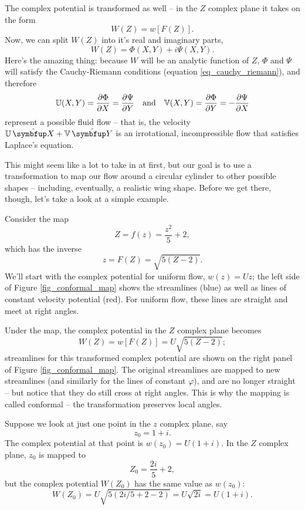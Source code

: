 The complex potential is transformed as well -- in the $Z$ complex plane it takes on the form
\begin{equation}
W(Z) = w[F(Z)].
\end{equation}
Now, we can split $W(Z)$ into it's real and imaginary parts,
\begin{equation}
W(Z) = \Phi(X, Y) + i\Psi(X, Y).
\end{equation}
Here's the amazing thing:  because $W$ will be an analytic function of $Z$, $\Phi$ and $\Psi$ will satisfy the Cauchy-Riemann conditions (equation \ref{eq_cauchy_riemann}), and therefore
\begin{equation}
\mathbb{U}(X, Y) = \frac{\partial {\Phi}}{\partial {X}} = \frac{\partial {\Psi}}{\partial {Y}} \quad \text{and} \quad \mathbb{V}(X, Y) = \frac{\partial {\Phi}}{\partial {Y}} = -\frac{\partial {\Psi}}{\partial {X}}
\end{equation}
represent a possible fluid flow -- that is, the velocity  $\U \, \unit{X} +  \V \, \unit{Y}$ is an irrotational, incompressible flow that satisfies Laplace's equation.

This might seem like a lot to take in at first, but our goal is to use a transformation to map our flow around a circular cylinder to other possible shapes -- including, eventually, a realistic wing shape.  Before we get there, though, let's take a look at a simple example.



\begin{example}
\label{ex_conformal_map}
Consider the map
\[
Z = f(z) = \frac{z^2}{5} + 2,
\]
which has the inverse 
\[
z = F(Z) = \sqrt{5(Z-2)}.
\]
We'll start with the complex potential for uniform flow, $w(z) = Uz$; the left side of Figure \ref{fig_conformal_map} shows the streamlines (blue) as well as lines of constant velocity potential (red).  For uniform flow, these lines are straight and meet at right angles.

Under the map, the complex potential in the $Z$ complex plane becomes
\[
W(Z) = w[F(Z)] = U\sqrt{5(Z-2)};
\]
streamlines for this transformed complex potential are shown on the right panel of Figure \ref{fig_conformal_map}.  The original streamlines are mapped to new streamlines (and similarly for the lines of constant $\varphi$), and are no longer straight -- but notice that they do still cross at right angles.  This is why the mapping is called conformal -- the transformation preserves local angles.

Suppose we look at just one point in the $z$ complex plane, say
\[
z_0 = 1 + i.
\]
The complex potential at that point is $w(z_0) = U(1+i)$.  In the $Z$ complex plane, $z_0$ is mapped to
\[
Z_0 = \frac{2i}{5} + 2,
\]
but the complex potential $W(Z_0)$ has the same value as $w(z_0)$:
\[
W(Z_0) = U\sqrt{5(2i/5 + 2 - 2)} = U\sqrt{2i} = U(1+i).
\]

\end{example}

